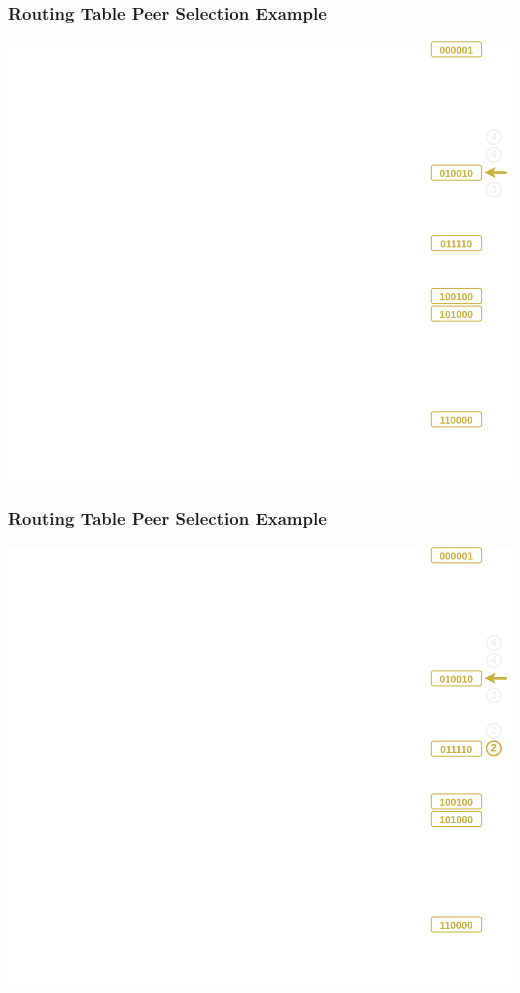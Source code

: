 \documentclass{../pl-slide}
\begin{document}
\begin{frame}
\frametitle{Routing Table Peer Selection Example}
\begin{center}
	\includegraphics[scale=.23]{resources/trie-features-bucket3.png}
\end{center}
\end{frame}

\begin{frame}
\frametitle{Routing Table Peer Selection Example}
\begin{center}
	\includegraphics[scale=.23]{resources/trie-features-bucket2.png}
\end{center}
\end{frame}
\end{document}
